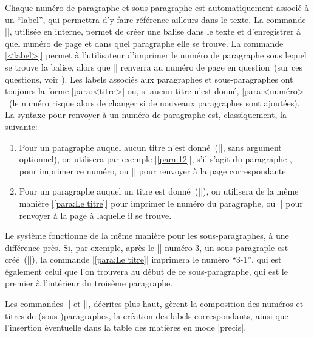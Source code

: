 Chaque numéro de paragraphe et sous-paragraphe est automatiquement associé à un \enquote{label}, qui permettra d'y faire référence ailleurs dans le texte. La commande |\label{<label>}|, utilisée en interne, permet de créer une balise dans le texte et d'enregistrer à quel numéro de page et dans quel paragraphe elle se trouve. La commande |\ref{<label>}| permet à l'utilisateur d'imprimer le numéro de paragraphe sous lequel se trouve la balise, alors que |\pageref{<label>}| renverra au numéro de page en question~(sur ces questions, voir ). Les labels associés aux paragraphes et sous-paragraphes ont toujours la forme |para:<titre>| ou, si aucun titre n'est donné, |para:<numéro>|~(le numéro risque alors de changer si de nouveaux paragraphes sont ajoutées). La syntaxe pour renvoyer à un numéro de paragraphe est, classiquement, la suivante:
\begin{enumerate}
\item Pour un paragraphe auquel aucun titre n'est donné~(|\para|, sans argument optionnel), on utilisera par exemple |\ref{para:12}|, s'il s'agit du paragraphe , pour imprimer ce numéro, ou |\pageref{para:12}| pour renvoyer à la page correspondante.
\item Pour un paragraphe auquel un titre est donné~(|\para[Le titre]|), on utilisera de la même manière |\ref{para:Le titre}| pour imprimer le numéro du paragraphe, ou |\pageref{para:Le titre}| pour renvoyer à la page à laquelle il se trouve.
\end{enumerate}

Le système fonctionne de la même manière pour les sous-paragraphes, à une différence près. Si, par exemple, après le |\para| numéro 3, un sous-paragraple est créé~(|\subpara[Le titre]|), la commande |\ref{para:Le titre}| imprimera le numéro \enquote{3-1}, qui est également celui que l'on trouvera au début de ce sous-paragraphe, qui est le premier à l'intérieur du troisème paragraphe.

\begin{developer}
Les commandes |\para| et |\subpara|, décrites plus haut, gèrent la composition des numéros et titres de (sous-)paragraphes, la création des labels correspondants, ainsi que l'insertion éventuelle dans la table des matières en mode |precis|.
\end{developer}


